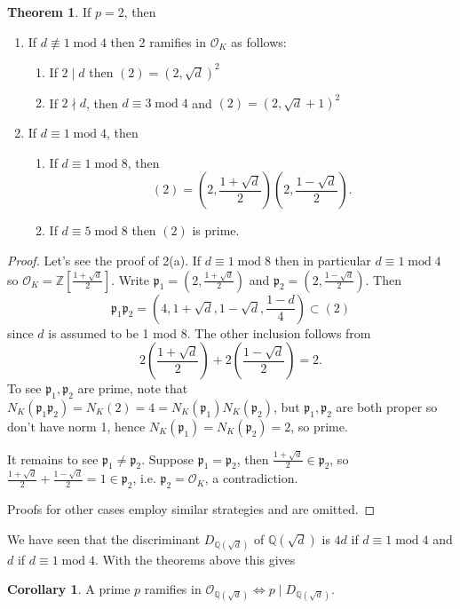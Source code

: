 \documentclass{article}
\newcommand{\Z}{\mathbb{Z}}
\newcommand{\Q}{\mathbb{Q}}
\newcommand{\Mod}{\operatorname{mod}}
\newcommand{\ri}{\mathcal{O}}
\newcommand{\ip}{\mathfrak{p}}
\theoremstyle{definition}
\newtheorem{thm}[defn]{Theorem}
\newtheorem{coro}[defn]{Corollary}
\begin{document}
\begin{thm}
\label{thm:quadrampis2}
If $p=2$, then
\begin{enumerate}
\item If $d\nequiv 1\Mod 4$ then 2 ramifies in $\ri_K$ as follows:
\begin{enumerate}
\item If $2\mid d$ then $(2)=\left(2,\sqrt{d}\right)^2$
\item If $2\nmid d$, then $d\equiv 3\Mod 4$ and $(2)=\left(2,\sqrt{d}+1\right)^2$
\end{enumerate}
\item If $d\equiv 1\Mod 4$, then
\begin{enumerate}
\item If $d\equiv 1\Mod 8$, then
\[
(2)=\left(2,\frac{1+\sqrt d}{2}\right)\left(2,\frac{1-\sqrt d}{2}\right).
\]
\item If $d\equiv 5\Mod 8$ then $(2)$ is prime.
\end{enumerate}
\end{enumerate}
\end{thm}
\begin{proof}
Let's see the proof of 2(a). If $d\equiv 1\Mod 8$ then in particular $d\equiv 1\Mod 4$ so $\ri_K=\Z\left[\frac{1+\sqrt d}{2}\right]$. Write $\ip_1=\left(2,\frac{1+\sqrt d}{2}\right)$ and $\ip_2=\left(2,\frac{1-\sqrt d}{2}\right)$. Then
\[
\ip_1\ip_2=\left(4,1+\sqrt d,1-\sqrt d,\frac{1-d}{4}\right)\subset (2)
\]
since $d$ is assumed to be 1 mod 8. The other inclusion follows from
\[
2\left(\frac{1+\sqrt d}{2}\right)+2\left(\frac{1-\sqrt d}{2}\right)=2.
\]
To see $\ip_1,\ip_2$ are prime, note that $N_K(\ip_1\ip_2)=N_K(2)=4=N_K(\ip_1)N_K(\ip_2)$, but $\ip_1,\ip_2$ are both proper so don't have norm 1, hence $N_K(\ip_1)=N_K(\ip_2)=2$, so prime.

It remains to see $\ip_1\neq\ip_2$. Suppose $\ip_1=\ip_2$, then $\frac{1+\sqrt d}{2}\in\ip_2$, so $\frac{1+\sqrt d}{2}+\frac{1-\sqrt d}{2}=1\in\ip_2$, i.e. $\ip_2=\ri_K$, a contradiction.

Proofs for other cases employ similar strategies and are omitted.
\end{proof}

We have seen that the discriminant $D_{\Q\left(\sqrt d\right)}$ of $\Q\left(\sqrt d\right)$ is $4d$ if $d\equiv 1\Mod 4$ and $d$ if $d\equiv 1\Mod 4$. With the theorems above this gives

\begin{coro}
A prime $p$ ramifies in $\ri_{\Q\left(\sqrt d\right)}\iff p\mid D_{\Q\left(\sqrt d\right)}$.
\end{coro}
\end{document}
